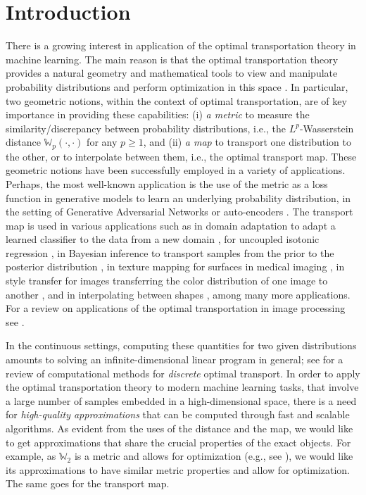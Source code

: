 \documentclass[10pt]{article}
\newcommand{\W}{\mathds{W}}
\numberwithin{equation}{section}
\begin{document}
\section{Introduction}%
There is a growing interest in application of the optimal transportation theory in machine learning. The main reason is that the optimal transportation theory provides a natural geometry and mathematical tools to view and manipulate probability distributions and perform optimization in this space \citep{ambrosio2008gradient}. In particular, two geometric notions, within the context of optimal transportation, are of key importance in providing these capabilities: (i) {\em a metric} to measure the similarity/discrepancy between probability distributions, i.e., the $L^p$-Wasserstein distance $\W_p(\cdot,\cdot)$ for any $p\geq 1$, and (ii) {\em a map} to transport one distribution to the other, or to interpolate between them, i.e., the optimal transport map. These geometric notions have been successfully employed in a variety of applications. Perhaps, the most well-known application is the use of the metric as a loss function in generative models to learn an underlying probability distribution, in the setting of Generative Adversarial Networks \citep{arjovsky2017wasserstein} or auto-encoders \citep{tolstikhin2017wasserstein}. The transport map is used in various applications such as in domain adaptation to adapt a learned classifier to the data from a new domain \citep{courty2017joint,courty2015optimal}, for uncoupled isotonic regression \citep{rigollet2018uncoupled}, in Bayesian inference to transport samples from the prior to the posterior distribution \citep{el2012bayesian,reich2013nonparametric}, in texture mapping for surfaces in medical imaging \citep{dominitz2010texture,rabin2011wasserstein}, in style transfer for images transferring the color distribution of one image to another \citep{ferradans2014regularized}, and in interpolating between shapes \citep{su2015optimal}, among many more applications. For a review on applications of the optimal transportation in image processing see \citet{kolouri2017optimal}. 

In the continuous settings, computing these quantities for two given distributions amounts to solving an infinite-dimensional linear program in general; see \cite{peyre2017computational} for a review of computational methods for {\em discrete} optimal transport. In order to apply the optimal transportation theory to modern machine learning tasks, that involve a large number of samples embedded in a high-dimensional space, there is a need for {\em high-quality approximations} that can be computed through fast and scalable algorithms. As evident from the uses of the distance and the map, we would like to get approximations that share the crucial properties of the exact objects. For example, as $\W_2$ is a metric and allows for optimization (e.g., see \citet{ambrosio2008gradient}), we would like its approximations to have similar metric properties and allow for optimization. The same goes for the transport map. 
\end{document}
